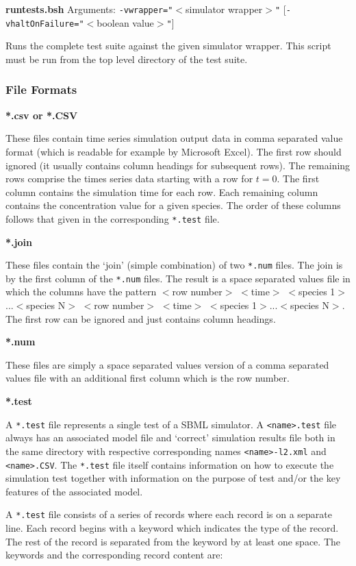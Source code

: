 \documentclass{cekarticle}
\begin{document}
\textbf{runtests.bsh} Arguments: \texttt{-vwrapper="}$<$simulator
wrapper$>$\texttt{"} [\texttt{-vhaltOnFailure="}$<$boolean
value$>$\texttt{"}]

Runs the complete test suite against the given simulator wrapper.
This script must be run from the top level directory of the test
suite.

\subsubsection{File Formats}
\label{sec:formats}

\textbf{*.csv or *.CSV}

These files contain time series simulation output data in comma
separated value format (which is readable for example by Microsoft
Excel).  The first row should ignored (it usually contains column
headings for subsequent rows).  The remaining rows comprise the
times series data starting with a row for $t=0$.  The first column
contains the simulation time for each row.  Each remaining column
contains the concentration value for a given species.  The order
of these columns follows that given in the corresponding
\texttt{*.test} file.

\textbf{*.join}

These files contain the `join' (simple combination) of two
\texttt{*.num} files. The join is by the first column of the
\texttt{*.num} files.  The result is a space separated values file
in which the columns have the pattern $<$row number$>$ $<$time$>$
$<$species 1$>$...$<$species N$>$ $<$row number$>$ $<$time$>$
$<$species 1$>$...$<$species N$>$. The first row can be ignored
and just contains column headings.

\textbf{*.num}

These files are simply a space separated values version of a comma
separated values file with an additional first column which is the
row number.

\textbf{*.test}

A \texttt{*.test} file represents a single test of a SBML
simulator. A \texttt{<name>.test} file always has an associated
model file and `correct' simulation results file both in the same
directory with respective corresponding names
\texttt{<name>-l2.xml} and \texttt{<name>.CSV}.  The
\texttt{*.test} file itself contains information on how to execute
the simulation test together with information on the purpose of
test and/or the key features of the associated model.

A \texttt{*.test} file consists of a series of records where each
record is on a separate line.  Each record begins with a keyword
which indicates the type of the record.  The rest of the record is
separated from the keyword by at least one space.  The keywords
and the corresponding record content are:
\end{document}
